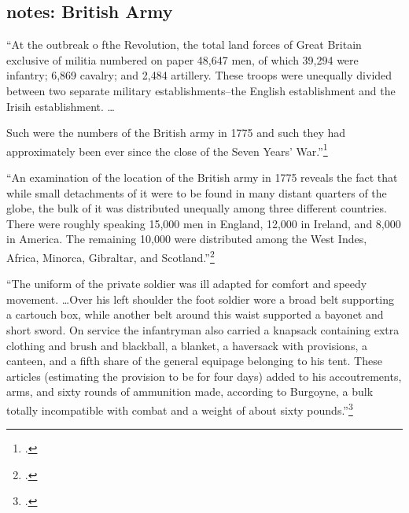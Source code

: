 % 
% 
% 


\subsection{notes: British Army}
``At the outbreak o fthe Revolution, the total land forces of Great Britain
exclusive of militia numbered on paper 48,647 men, of which 39,294 were
infantry; 6,869 cavalry; and 2,484 artillery. These troops were unequally
divided between two separate military establishments--the English establishment
and the Irisih establishment. \ldots

Such were the numbers of the British army in 1775 and such they had
approximately been ever since the close of the Seven Years' War.''\footcite[1]{curtis_org_1972}

``An examination of the location of the British army in 1775 reveals the fact
that while small detachments of it were to be found in many distant quarters of
the globe, the bulk of it was distributed unequally among three different
countries. There were roughly speaking 15,000 men in England, 12,000 in
Ireland, and 8,000 in America. The remaining 10,000 were distributed among the
West Indes, Africa, Minorca, Gibraltar, and
Scotland.''\footcite[2]{curtis_org_1972}


``The uniform of the private soldier was ill adapted for comfort and speedy
movement. \ldots Over his left shoulder the foot soldier wore a broad belt
supporting a cartouch box, while another belt around this waist supported a
bayonet and short sword. On service the infantryman also carried a knapsack
containing extra clothing and brush and blackball, a blanket, a haversack with
provisions, a canteen, and a fifth share of the general equipage belonging to
his tent. These articles (estimating the provision to be for four days) added
to his accoutrements, arms, and sixty rounds of ammunition made, according to
Burgoyne, a bulk totally incompatible with combat and a weight of about sixty
pounds.''\footcite[14-15]{curtis_org_1972}

